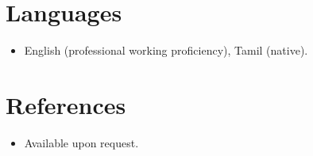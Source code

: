 \documentclass[11pt,a4paper,sans]{moderncv}
\begin{document}
\section{Languages}
\vspace{1pt}
\begin{itemize}
\item English (professional working proficiency), Tamil (native).
\end{itemize}


\section{References}
\vspace{1pt}
\begin{itemize}
\item{Available upon request.}
\end{itemize}
\end{document}
